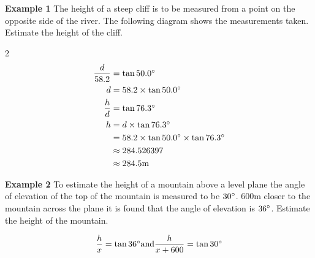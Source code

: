 \textbf{Example 1}
The height of a steep cliff is to be measured from a point on the opposite side of the river.  The
following diagram shows the measurements taken. Estimate the height of the cliff. 
\columnsep =30pt
\begin {multicols}{2}
\setlength\fboxrule{0in}\setlength\fboxsep{0.2in}
\begin{align*}\frac{d}{58.2} &  =  \tan  50.0 \mbox{{\ensuremath{{}^\circ}}} \\
d &  =  58.2 \times \tan  50.0 \mbox{{\ensuremath{{}^\circ}}} \\
\frac{h}{d} &  =  \tan  76.3 \mbox{{\ensuremath{{}^\circ}}} \\
h &  =  d \times \tan  76.3 \mbox{{\ensuremath{{}^\circ}}} \\
 &  =  58.2 \times \tan  50.0 \mbox{{\ensuremath{{}^\circ}}} \times \tan  76.3 \mbox{{\ensuremath{{}^\circ}}} \\
 &  \approx   284.526397 \\
 &  \approx   284.5 \mbox{m}\end{align*}
\end {multicols}

\textbf{Example 2}
To estimate the height of a mountain above a level plane the angle of elevation of the top of the mountain is measured to be $30 \mbox{{\ensuremath{{}^\circ}}}$. $600 \mbox{m}$ closer to the mountain across the plane it is found that the angle of elevation is $36 \mbox{{\ensuremath{{}^\circ}}}$. Estimate the height of the mountain. 
\setlength\fboxrule{0in}\setlength\fboxsep{0.2in}

\begin{equation*}\frac{h}{x} =\tan  36 \mbox{{\ensuremath{{}^\circ}}}\text{and}\frac{h}{x +600} =\tan  30 \mbox{{\ensuremath{{}^\circ}}}
\end{equation*}

